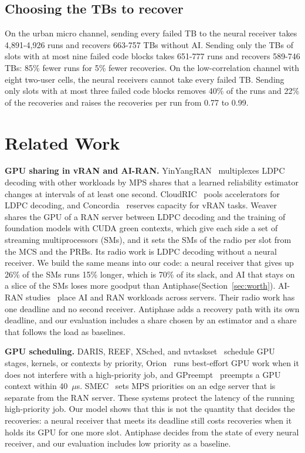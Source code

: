 \documentclass[acmsmall,screen,review,anonymous]{acmart}
\newcommand{\sys}{Antiphase\xspace}
\begin{document}
\subsection{Choosing the TBs to recover}

On the urban micro channel, sending every failed TB to the neural receiver takes 4,891-4,926 runs and
recovers 663-757 TBs without AI. Sending only the TBs of slots with at most nine failed code blocks takes
651-777 runs and recovers 589-746 TBs: 85\% fewer runs for 5\% fewer recoveries. On the low-correlation
channel with eight two-user cells, the neural receivers cannot take every failed TB. Sending only slots
with at most three failed code blocks removes 40\% of the runs and 22\% of the recoveries and raises the
recoveries per run from 0.77 to 0.99.

\section{Related Work}

\noindent\textbf{GPU sharing in vRAN and AI-RAN.} YinYangRAN~\cite{yinyangran} multiplexes LDPC decoding
with other workloads by MPS shares that a learned reliability estimator changes at intervals of at least
one second. CloudRIC~\cite{cloudric} pools accelerators for LDPC decoding, and
Concordia~\cite{concordia} reserves capacity for vRAN tasks. Weaver~\cite{weaver} shares the GPU of a RAN
server between LDPC decoding and the training of foundation models with CUDA green contexts, which give each
side a set of streaming multiprocessors (SMs), and it sets the SMs of the radio per slot from the MCS and the
PRBs. Its radio work is LDPC decoding without a neural receiver. We build the same means into our code: a
neural receiver that gives up 26\% of the SMs runs 15\% longer, which is 70\% of its slack, and AI that
stays on a slice of the SMs loses more goodput than \sys (Section~\ref{sec:worth}). AI-RAN
studies~\cite{interplay,caora,haf,distributedairan} place AI and RAN workloads across servers. Their radio
work has one deadline and no second receiver. \sys adds a recovery path with its own deadline, and our
evaluation includes a share chosen by an estimator and a share that follows the load as baselines.

\noindent\textbf{GPU scheduling.} DARIS, REEF, XSched, and nvtaskset~\cite{daris,reef,xsched,nvtaskset}
schedule GPU stages, kernels, or contexts by priority, Orion~\cite{orion} runs best-effort GPU work when
it does not interfere with a high-priority job, and GPreempt~\cite{gpreempt} preempts a GPU context within
40~$\mu$s. SMEC~\cite{smec} sets MPS priorities on an edge server that
is separate from the RAN server. These systems protect the latency of the running high-priority job. Our
model shows that this is not the quantity that decides the recoveries: a neural receiver that meets its
deadline still costs recoveries when it holds its GPU for one more slot. \sys decides from the state of
every neural receiver, and our evaluation includes low priority as a baseline.
\end{document}
